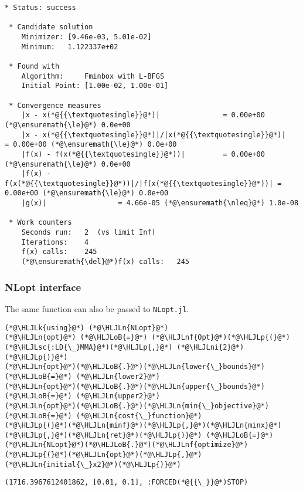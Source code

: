 \documentclass[12pt,a4paper]{article}
\newcommand{\HLJLk}[1]{\textcolor[RGB]{148,91,176}{\textbf{#1}}}
\newcommand{\HLJLn}[1]{#1}
\newcommand{\HLJLnf}[1]{\textcolor[RGB]{66,102,213}{#1}}
\newcommand{\HLJLsc}[1]{\textcolor[RGB]{201,61,57}{#1}}
\newcommand{\HLJLni}[1]{\textcolor[RGB]{59,151,46}{#1}}
\newcommand{\HLJLoB}[1]{\textcolor[RGB]{102,102,102}{\textbf{#1}}}
\newcommand{\HLJLp}[1]{#1}
\begin{document}
\begin{lstlisting}
* Status: success

 * Candidate solution
    Minimizer: [9.46e-03, 5.01e-02]
    Minimum:   1.122337e+02

 * Found with
    Algorithm:     Fminbox with L-BFGS
    Initial Point: [1.00e-02, 1.00e-01]

 * Convergence measures
    |x - x(*@{{\textquotesingle}}@*)|               = 0.00e+00 (*@\ensuremath{\le}@*) 0.0e+00
    |x - x(*@{{\textquotesingle}}@*)|/|x(*@{{\textquotesingle}}@*)|          = 0.00e+00 (*@\ensuremath{\le}@*) 0.0e+00
    |f(x) - f(x(*@{{\textquotesingle}}@*))|         = 0.00e+00 (*@\ensuremath{\le}@*) 0.0e+00
    |f(x) - f(x(*@{{\textquotesingle}}@*))|/|f(x(*@{{\textquotesingle}}@*))| = 0.00e+00 (*@\ensuremath{\le}@*) 0.0e+00
    |g(x)|                 = 4.66e-05 (*@\ensuremath{\nleq}@*) 1.0e-08

 * Work counters
    Seconds run:   2  (vs limit Inf)
    Iterations:    4
    f(x) calls:    245
    (*@\ensuremath{\del}@*)f(x) calls:   245
\end{lstlisting}


\subsubsection{NLopt interface}
The same function can also be passed to \texttt{NLopt.jl}.


\begin{lstlisting}
(*@\HLJLk{using}@*) (*@\HLJLn{NLopt}@*)
(*@\HLJLn{opt}@*) (*@\HLJLoB{=}@*) (*@\HLJLnf{Opt}@*)(*@\HLJLp{(}@*)(*@\HLJLsc{:LD{\_}MMA}@*)(*@\HLJLp{,}@*) (*@\HLJLni{2}@*)(*@\HLJLp{)}@*)
(*@\HLJLn{opt}@*)(*@\HLJLoB{.}@*)(*@\HLJLn{lower{\_}bounds}@*) (*@\HLJLoB{=}@*) (*@\HLJLn{lower2}@*)
(*@\HLJLn{opt}@*)(*@\HLJLoB{.}@*)(*@\HLJLn{upper{\_}bounds}@*) (*@\HLJLoB{=}@*) (*@\HLJLn{upper2}@*)
(*@\HLJLn{opt}@*)(*@\HLJLoB{.}@*)(*@\HLJLn{min{\_}objective}@*) (*@\HLJLoB{=}@*) (*@\HLJLn{cost{\_}function}@*)
(*@\HLJLp{(}@*)(*@\HLJLn{minf}@*)(*@\HLJLp{,}@*)(*@\HLJLn{minx}@*)(*@\HLJLp{,}@*)(*@\HLJLn{ret}@*)(*@\HLJLp{)}@*) (*@\HLJLoB{=}@*) (*@\HLJLn{NLopt}@*)(*@\HLJLoB{.}@*)(*@\HLJLnf{optimize}@*)(*@\HLJLp{(}@*)(*@\HLJLn{opt}@*)(*@\HLJLp{,}@*)(*@\HLJLn{initial{\_}x2}@*)(*@\HLJLp{)}@*)
\end{lstlisting}

\begin{lstlisting}
(1716.3967612401862, [0.01, 0.1], :FORCED(*@{{\_}}@*)STOP)
\end{lstlisting}
\end{document}
